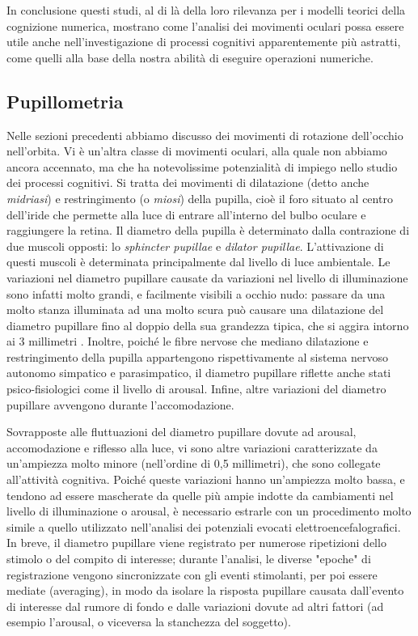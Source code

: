 \documentclass[12pt]{article}
\begin{document}
In conclusione questi studi, al di là della loro rilevanza per i modelli teorici della cognizione numerica, mostrano come l'analisi dei movimenti oculari possa essere utile anche nell'investigazione di processi cognitivi apparentemente più astratti, come quelli alla base della nostra abilità di eseguire operazioni numeriche.

\subsection{Pupillometria}

Nelle sezioni precedenti abbiamo discusso dei movimenti di rotazione dell'occhio nell'orbita. Vi è un'altra classe di movimenti oculari, alla quale non abbiamo ancora accennato, ma che ha notevolissime potenzialità di impiego nello studio dei processi cognitivi. Si tratta dei movimenti di dilatazione (detto anche \textit{midriasi}) e restringimento (o \textit{miosi}) della pupilla, cioè il foro situato al centro dell'iride che permette alla luce di entrare all'interno del bulbo oculare e raggiungere la retina. Il diametro della pupilla è determinato dalla contrazione di due muscoli opposti: lo \textit{sphincter pupillae} e \textit{dilator pupillae}. L'attivazione di questi muscoli è determinata principalmente dal livello di luce ambientale. Le variazioni nel diametro pupillare causate da variazioni nel livello di illuminazione sono infatti molto grandi, e facilmente visibili a occhio nudo: passare da una molto stanza illuminata ad una molto scura può causare una dilatazione del diametro pupillare fino al doppio della sua grandezza tipica, che si aggira intorno ai 3 millimetri \cite{MacLachlan2002}. Inoltre, poiché le fibre nervose che mediano dilatazione e restringimento della pupilla appartengono rispettivamente al sistema nervoso autonomo simpatico e parasimpatico, il diametro pupillare riflette anche stati psico-fisiologici come il livello di arousal. Infine, altre variazioni del diametro pupillare avvengono durante l'accomodazione.

Sovrapposte alle fluttuazioni del diametro pupillare dovute ad arousal, accomodazione e riflesso alla luce, vi sono altre variazioni caratterizzate da un'ampiezza molto minore (nell'ordine di 0,5 millimetri), che sono collegate all'attività cognitiva. Poiché queste variazioni hanno un'ampiezza molto bassa, e tendono ad essere mascherate da quelle più ampie indotte da cambiamenti nel livello di illuminazione o arousal, è necessario estrarle con un procedimento molto simile a quello utilizzato nell'analisi dei potenziali evocati elettroencefalografici. In breve, il diametro pupillare viene registrato per numerose ripetizioni dello stimolo o del compito di interesse; durante l'analisi, le diverse "epoche" di registrazione vengono sincronizzate con gli eventi stimolanti, per poi essere mediate (averaging), in modo da isolare la risposta pupillare causata dall'evento di interesse dal rumore di fondo e dalle variazioni dovute ad altri fattori (ad esempio l'arousal, o viceversa la stanchezza del soggetto). 
\end{document}
